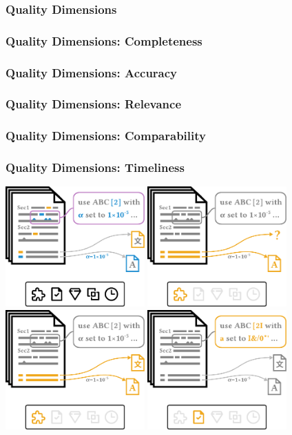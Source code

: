 \documentclass[en,16:9,smallfoot]{sdqbeamer}
\begin{document}
   \begin{frame}
       \frametitle<1>{Quality Dimensions}
       \frametitle<2-3>{Quality Dimensions: Completeness}
       \frametitle<4-5>{Quality Dimensions: Accuracy}
       \frametitle<6-7>{Quality Dimensions: Relevance}
       \frametitle<8-9>{Quality Dimensions: Comparability}
       \frametitle<10-12>{Quality Dimensions: Timeliness}
       \begin{overprint}
            \centering\includegraphics[width=0.4\textwidth]{imgs/schema_asp_x_x}
            \centering\includegraphics[width=0.4\textwidth]{imgs/schema_asp_0_0}
            \centering\includegraphics[width=0.4\textwidth]{imgs/schema_asp_0_1}
            \centering\includegraphics[width=0.4\textwidth]{imgs/schema_asp_1_0}

\end{overprint}
\end{frame}
\end{document}
